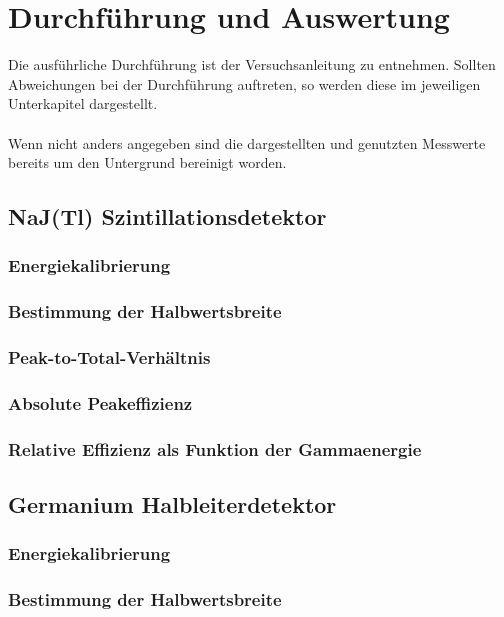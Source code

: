 \documentclass[11pt, a4paper]{article}
\numberwithin{equation}{section}
\begin{document}
\section{Durchführung und Auswertung}
Die ausführliche Durchführung ist der Versuchsanleitung \cite{anleitung} zu entnehmen.
Sollten Abweichungen bei der Durchführung auftreten, so werden diese im jeweiligen Unterkapitel dargestellt.
\\
\\
Wenn nicht anders angegeben sind die dargestellten und genutzten Messwerte bereits um den Untergrund bereinigt worden.

\subsection{NaJ(Tl) Szintillationsdetektor}

\subsubsection{Energiekalibrierung}

\subsubsection{Bestimmung der Halbwertsbreite}

\subsubsection{Peak-to-Total-Verhältnis}

\subsubsection{Absolute Peakeffizienz}

\subsubsection{Relative Effizienz als Funktion der Gammaenergie}


\subsection{Germanium Halbleiterdetektor}

\subsubsection{Energiekalibrierung}

\subsubsection{Bestimmung der Halbwertsbreite}
\end{document}
